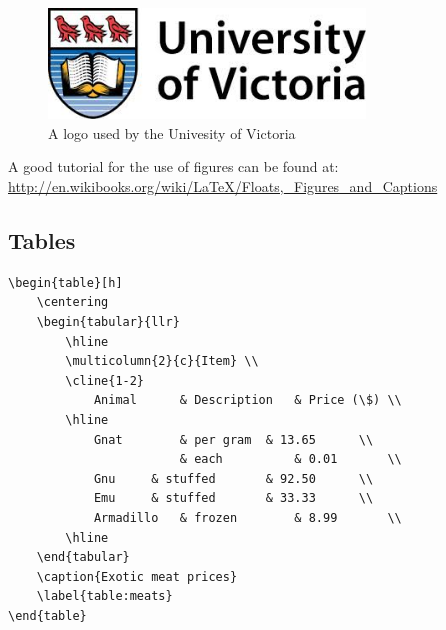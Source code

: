 \documentclass[12pt]{article}
\begin{document}
\begin{figure}[h] 	%
	\centering		%
	\includegraphics[width=0.75\textwidth]{Uvic_logo} 	
	\caption{A logo used by the Univesity of Victoria}
	\label{fig:uvic_logo}
\end{figure}

A good tutorial for the use of figures can be found at: \url{http://en.wikibooks.org/wiki/LaTeX/Floats,_Figures_and_Captions}

\pagebreak
\subsection{Tables}\label{sec:tables}
\begin{verbatim}
\begin{table}[h]
	\centering
	\begin{tabular}{llr}
		\hline
		\multicolumn{2}{c}{Item} \\
		\cline{1-2}
			Animal   	& Description 	& Price (\$) \\
		\hline
			Gnat		& per gram	& 13.65      \\
				        & each       	& 0.01       \\
			Gnu		& stuffed     	& 92.50      \\
			Emu		& stuffed		& 33.33      \\
			Armadillo	& frozen		& 8.99       \\
		\hline
	\end{tabular}
	\caption{Exotic meat prices}
	\label{table:meats}
\end{table}
\end{verbatim}
\end{document}

